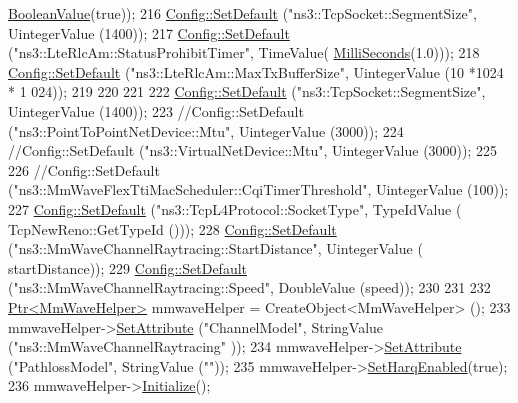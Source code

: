 \begin{DoxyCode}
      \hyperlink{classns3_1_1BooleanValue}{BooleanValue}(\textcolor{keyword}{true}));
216         \hyperlink{group__config_ga2e7882df849d8ba4aaad31c934c40c06}{Config::SetDefault} (\textcolor{stringliteral}{"ns3::TcpSocket::SegmentSize"}, UintegerValue (1400));
217         \hyperlink{group__config_ga2e7882df849d8ba4aaad31c934c40c06}{Config::SetDefault} (\textcolor{stringliteral}{"ns3::LteRlcAm::StatusProhibitTimer"}, TimeValue(
      \hyperlink{group__timecivil_gaf26127cf4571146b83a92ee18679c7a9}{MilliSeconds}(1.0)));
218         \hyperlink{group__config_ga2e7882df849d8ba4aaad31c934c40c06}{Config::SetDefault} (\textcolor{stringliteral}{"ns3::LteRlcAm::MaxTxBufferSize"}, UintegerValue (10 *1024 * 1
      024));
219 
220 
221 
222         \hyperlink{group__config_ga2e7882df849d8ba4aaad31c934c40c06}{Config::SetDefault} (\textcolor{stringliteral}{"ns3::TcpSocket::SegmentSize"}, UintegerValue (1400));
223         \textcolor{comment}{//Config::SetDefault ("ns3::PointToPointNetDevice::Mtu", UintegerValue (3000));}
224         \textcolor{comment}{//Config::SetDefault ("ns3::VirtualNetDevice::Mtu", UintegerValue (3000));}
225 
226         \textcolor{comment}{//Config::SetDefault ("ns3::MmWaveFlexTtiMacScheduler::CqiTimerThreshold", UintegerValue (100));}
227         \hyperlink{group__config_ga2e7882df849d8ba4aaad31c934c40c06}{Config::SetDefault} (\textcolor{stringliteral}{"ns3::TcpL4Protocol::SocketType"}, TypeIdValue (
      TcpNewReno::GetTypeId ()));
228     \hyperlink{group__config_ga2e7882df849d8ba4aaad31c934c40c06}{Config::SetDefault} (\textcolor{stringliteral}{"ns3::MmWaveChannelRaytracing::StartDistance"}, UintegerValue (
      startDistance));
229     \hyperlink{group__config_ga2e7882df849d8ba4aaad31c934c40c06}{Config::SetDefault} (\textcolor{stringliteral}{"ns3::MmWaveChannelRaytracing::Speed"}, DoubleValue (speed));
230 
231 
232         \hyperlink{classns3_1_1Ptr}{Ptr<MmWaveHelper>} mmwaveHelper = CreateObject<MmWaveHelper> ();
233         mmwaveHelper->\hyperlink{classns3_1_1ObjectBase_ac60245d3ea4123bbc9b1d391f1f6592f}{SetAttribute} (\textcolor{stringliteral}{"ChannelModel"}, StringValue (\textcolor{stringliteral}{"ns3::MmWaveChannelRaytracing"}
      ));
234         mmwaveHelper->\hyperlink{classns3_1_1ObjectBase_ac60245d3ea4123bbc9b1d391f1f6592f}{SetAttribute} (\textcolor{stringliteral}{"PathlossModel"}, StringValue (\textcolor{stringliteral}{""}));
235         mmwaveHelper->\hyperlink{classns3_1_1MmWaveHelper_af211a02952ab5f4eabe0219cf53e7e1c}{SetHarqEnabled}(\textcolor{keyword}{true});
236         mmwaveHelper->\hyperlink{classns3_1_1Object_af4411cb29971772fcd09203474a95078}{Initialize}();

\end{DoxyCode}
